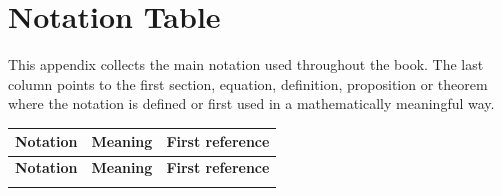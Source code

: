 
\section{Notation Table}
\label{app-notation-table}

This appendix collects the main notation used throughout the book. The last
column points to the first section, equation, definition, proposition or theorem
where the notation is defined or first used in a mathematically meaningful way.

{\small
\setlength{\tabcolsep}{4pt}
\renewcommand{\arraystretch}{1.16}
\begin{longtable}{>{\raggedright\arraybackslash}p{}
                  >{\raggedright\arraybackslash}p{}
                  >{\raggedright\arraybackslash}p{}}
\hline
\textbf{Notation} & \textbf{Meaning} & \textbf{First reference} \\
\hline
\endfirsthead
\hline
\textbf{Notation} & \textbf{Meaning} & \textbf{First reference} \\
\hline
\endhead
\hline
\endfoot


\end{longtable}}
